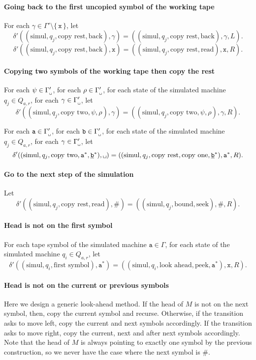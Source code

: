 \documentclass{article}
\newcommand{\obullet}[1]{\ensuremath{#1^*}}
\newcommand{\0}{\texttt{\textvisiblespace}}
\newcommand{\°}{\obullet{\0}}
\newcommand{\A}{\obullet{\s}}
\newcommand{\HQ}{\obullet{\underline{\w}}}
\newcommand{\s}{\texttt{a}}
\newcommand{\w}{\texttt{b}}
\newcommand{\X}{\texttt{x}}
\newcommand{\e}{\texttt{\#}}
\newcommand{\gpwb}{\Gamma'_{\0{}}}
\newcommand{\qwar}{Q_{a,r}}
\begin{document}
\paragraph{Going back to the first uncopied symbol of the working tape}
For each $\gamma \in \Gamma' \setminus\{\,\X\,\}$,
let $$\delta'((\text{simul}, q_j, \text{copy rest}, \text{back}), \gamma)
= ((\text{simul}, q_j, \text{copy rest}, \text{back}), \gamma, L).$$
$$\delta'((\text{simul}, q_j, \text{copy rest}, \text{back}), \X)
= ((\text{simul}, q_j, \text{copy rest}, \text{read}), \X, R).$$

\paragraph{Copying two symbols of the working tape then copy the rest}
For each $\psi \in \gpwb$,
for each $\rho \in \gpwb$,
for each state of the simulated machine $q_j \in \qwar$,
for each $\gamma \in \gpwb$,
let $$\delta'((\text{simul}, q_j, \text{copy two}, \psi, \rho), \gamma)
= ((\text{simul}, q_j, \text{copy two}, \psi, \rho), \gamma, R).$$

For each $\s \in \gpwb$,
for each $\w \in \gpwb$,
for each state of the simulated machine $q_j \in \qwar$,
for each $\gamma \in\gpwb$,
let $$\delta'((\text{simul}, q_j, \text{copy two}, \A, \HQ), \0{})
= ((\text{simul}, q_j, \text{copy rest}, \text{copy one}, \HQ), \A, R).$$

\paragraph{Go to the next step of the simulation}
Let $$\delta'((\text{simul}, q_j, \text{copy rest}, \text{read}), \e)
= ((\text{simul}, q_j, \text{bound}, \text{seek}), \e, R).$$

\paragraph{Head is not on the first symbol}
For each tape symbol of the simulated machine $\s \in \Gamma$,
for each state of the simulated machine $q_i \in \qwar$,
let $$\delta'((\text{simul}, q_i, \text{first symbol}),\A)
=((\text{simul}, q_i, \text{look ahead}, \text{peek}, \A), \X, R).$$

\paragraph{Head is not on the current or previous symbols}
Here we design a generic look-ahead method. If the head of $M$ is not on the next
symbol, then, copy the current symbol and recurse. Otherwise, if the transition
asks to move left, copy the current and next symbols accordingly. If the
transition asks to move right, copy the current, next and after next symbols
accordingly. Note that the head of $M$ is always pointing to exactly one symbol
by the previous construction, so we never have the case where the next symbol
is $\e$.
\end{document}

